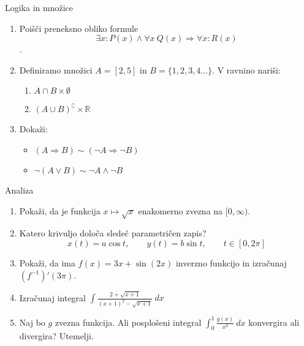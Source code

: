 \begin{frame}{Logika in množice}
	\begin{enumerate}
		\item
		Poišči preneksno obliko formule 
		\[\exists x : P(x) \wedge \forall x \: Q(x) \Rightarrow \forall x : R(x)\].
		\item 
		Definiramo množici $A = [2,5]$ in $B = \{ {1, 2, 3, 4 \dots} \}$.
		V ravnino nariši:
		\begin{enumerate}
		   \item $ A \cap B \times \emptyset $
		   \item $ (A \cup B)^\complement \times \mathbb{R} $
		\end{enumerate}
		\item
		Dokaži:
		\begin{itemize}
			\item $ (A \Rightarrow B) \sim (\neg A \Rightarrow \neg B) $
			\item $ \neg (A \vee B) \sim \neg A \wedge \neg B $
		\end{itemize}
	\end{enumerate}
\end{frame}

\begin{frame}{Analiza}
	\begin{enumerate}
		\item
		Pokaži, da je funkcija $ x \mapsto \sqrt{x}$ enakomerno zvezna na $ [0,\infty) $.
		\item 
		Katero krivuljo določa sledeč parametričen zapis?
		$$
		   x(t) = a \cos t, \qquad %
		   y(t) = b \sin t, \qquad %
		   t \in [0, 2 \pi]
		$$ 
		\item
		Pokaži, da ima $ f(x) = 3x + \sin (2x) $ inverzno funkcijo in izračunaj $ (f^{-1})'(3\pi) $.
		
		\item
		Izračunaj integral 
		$ \int \frac{2+\sqrt{x+1}}{(x+1)^2-\sqrt{x+1}} \: dx $
	 
		\item 
		Naj bo $g$ zvezna funkcija. Ali posplošeni integral 
		$ \int_{0}^{1} \frac{g(x)}{x^2} \: dx$
		konvergira ali divergira? Utemelji.
	\end{enumerate}
\end{frame}

